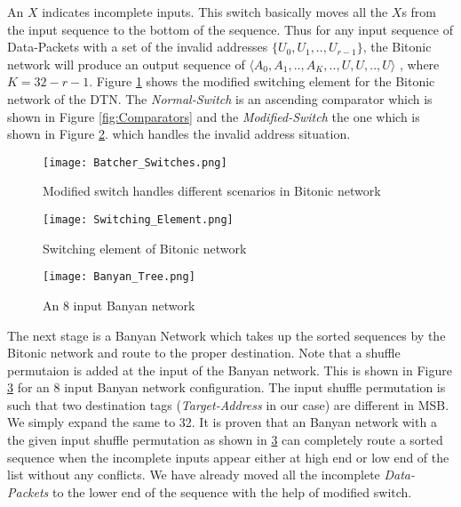 					      An $X$ indicates incomplete inputs. This switch basically moves all the $X$s from the input sequence to the bottom of the sequence.
					      Thus for any input sequence of Data-Packets with a set of  the invalid addresses $\{U_{0},U_{1},..,U_{r-1}\}$, the Bitonic network will produce an output sequence of $\langle A_{0},A_{1},..,A_{K},..,U,U,..,U \rangle$ , where
					      $ K = 32 - r -1$. Figure \ref{fig:Batcher_Switches} shows the modified switching element for the Bitonic network of the DTN. The \textit{Normal-Switch} is an ascending comparator which is shown in Figure \ref{fig:Comparators} and
					      the \textit{Modified-Switch} the one which is shown in Figure \ref{fig:Switching_Element}. which handles the invalid address situation.
					      \begin{figure}[!ht]
						      \texttt{[image: Batcher\_Switches.png]}
						      \caption{Modified switch handles different scenarios in Bitonic network}
					      \label{fig:Batcher_Switches}
					      \end{figure}
					      \begin{figure}[!ht]
						      \texttt{[image: Switching\_Element.png]}
						      \caption{Switching element of Bitonic network}
					      \label{fig:Switching_Element}
					      \end{figure}
					      \begin{figure}[!ht]
						      \texttt{[image: Banyan\_Tree.png]}
						      \caption{An 8 input Banyan network}
					      \label{fig:Banyan_Tree}
					      \end{figure}
					      The next stage is a Banyan Network which takes up the sorted sequences by the Bitonic network and route to the proper destination. Note that a shuffle permutaion is added at the input of the Banyan network.
					      This is shown in Figure \ref{fig:Banyan_Tree} for an 8 input Banyan network configuration. The input shuffle permutation is such that two destination tags (\textit{Target-Address} in our case) are different in MSB. We simply expand the same to 32. 
					      It is proven \cite{batcher_banyan_ref} that 
					      an Banyan network with a the given input shuffle permutation as shown in \ref{fig:Banyan_Tree} can completely route a sorted sequence when the incomplete inputs appear either at high end or low end of the list without any conflicts. We have already moved all the incomplete \textit{Data-Packets}
					      to the lower end of the sequence with the help of modified switch. 
